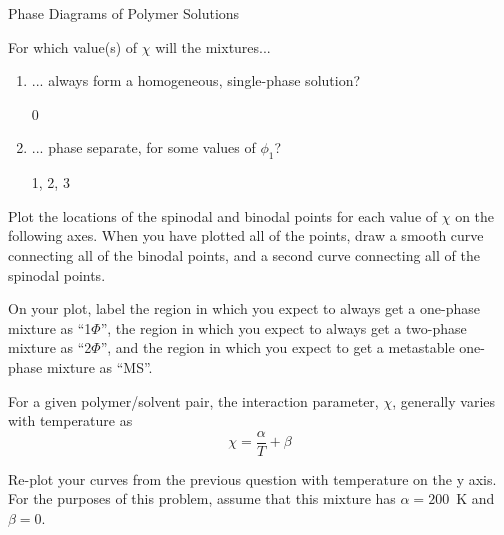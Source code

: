 \begin{activity}{Phase Diagrams of Polymer Solutions}
\begin{ctqs}

	\question For which value(s) of $\chi$ will the mixtures...
	
		\begin{enumerate}
			\item ... always form a homogeneous, single-phase solution?
				
				\begin{solution}[0.75in]
					0
				\end{solution}
			
			\item ... phase separate, for some values of $\phi_1$?
				\begin{solution}[0.75in]
					1, 2, 3
				\end{solution}
		\end{enumerate}
		
	\question Plot the locations of the spinodal and binodal points for each value of $\chi$ on the following axes.  When you have plotted all of the points, draw a smooth curve connecting all of the binodal points, and a second curve connecting all of the spinodal points.
	
		\begin{solution}[2in]
		\end{solution}
		
	\question On your plot, label the region in which you expect to always get a one-phase mixture as ``1$\Phi$'', the region in which you expect to always get a two-phase mixture as ``2$\Phi$'', and the region in which you expect to get a metastable one-phase mixture as ``MS''.
		
\end{ctqs}


\begin{infobox}
	For a given polymer/solvent pair, the interaction parameter, $\chi$, generally varies with temperature as
	\begin{equation*}
		\chi = \frac{\alpha}{T} + \beta
	\end{equation*}
\end{infobox}


\begin{ctqs}

	\question Re-plot your curves from the previous question with temperature on the y axis.  For the purposes of this problem, assume that this mixture has $\alpha=200$~K and $\beta=0$.
		\label{\labelbase:ctq:plotT}
	

\end{ctqs}
\end{activity}
